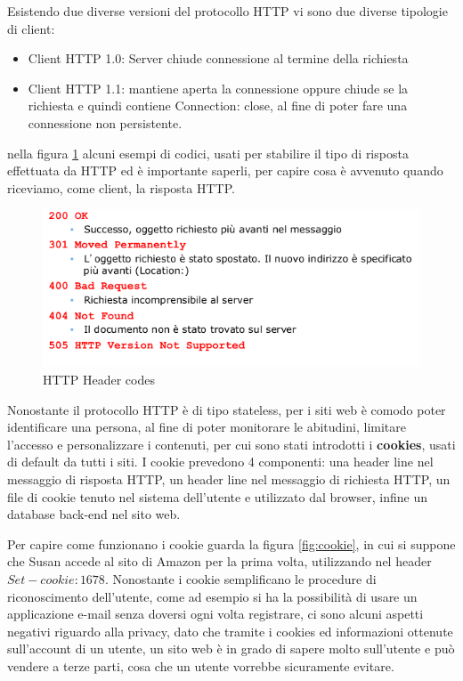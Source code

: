 \message{ !name(sd.tex)}\documentclass[a4paper,12pt, oneside]{book}
\begin{document}
Esistendo due diverse versioni del protocollo HTTP vi sono due diverse tipologie di client:
\begin{itemize}
	\item Client HTTP 1.0: Server chiude connessione al termine della richiesta
	\item Client HTTP 1.1: mantiene aperta la connessione oppure chiude se la richiesta e quindi
	      contiene Connection: close, al fine di poter fare una connessione non persistente.
\end{itemize}
nella figura \ref{http:headerCode} alcuni esempi di codici, usati per stabilire il tipo di risposta 
effettuata da HTTP ed è importante saperli, per capire cosa è avvenuto quando riceviamo, come client,
la risposta HTTP.

\begin{figure}
    \caption{HTTP Header codes}
    \label{http:headerCode}
	\includegraphics[scale=0.7]{img/http3.png}
\end{figure}
Nonostante il protocollo HTTP è di tipo stateless, per i siti web è comodo poter identificare una persona,
al fine di poter monitorare le abitudini, limitare l'accesso e personalizzare i contenuti, per cui sono 
stati introdotti i \textbf{cookies}, usati di default da tutti i siti.\newline
I cookie prevedono 4 componenti: una header line nel messaggio di risposta HTTP, un header line nel
messaggio di richiesta HTTP, un file di cookie tenuto nel sistema dell'utente e utilizzato dal browser,
infine un database back-end nel sito web.

Per capire come funzionano i cookie guarda la figura \ref{fig:cookie}, in cui si suppone che 
Susan accede al sito di Amazon per la prima volta, utilizzando nel header $Set-cookie: 1678$.\newline
Nonostante i cookie semplificano le procedure di riconoscimento dell'utente, come ad esempio 
si ha la possibilità di usare un applicazione e-mail senza doversi ogni volta registrare, 
ci sono alcuni aspetti negativi riguardo alla privacy, dato che tramite i cookies ed informazioni
ottenute sull'account di un utente, un sito web è in grado di sapere molto sull'utente e può 
vendere a terze parti, cosa che un utente vorrebbe sicuramente evitare.
\end{document}
